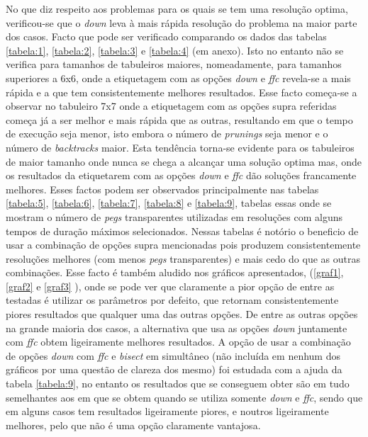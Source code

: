 \documentclass{llncs}
\begin{document}
No que diz respeito aos problemas para os quais se tem uma resolu\c{c}\~{a}o optima, verificou-se que o \emph{down} leva \`{a} mais r\'{a}pida resolu\c{c}\~{a}o do problema na maior parte dos casos. Facto que pode ser verificado comparando os dados das tabelas \ref{tabela:1}, \ref{tabela:2}, \ref{tabela:3} e \ref{tabela:4} (em anexo). Isto no entanto n\~{a}o se verifica para tamanhos de tabuleiros maiores, nomeadamente, para tamanhos superiores a 6x6, onde a etiquetagem com as op\c{c}\~{o}es \emph{down} e \emph{ffc} revela-se a mais r\'{a}pida e a que tem consistentemente melhores resultados. Esse facto come\c{c}a-se a observar no tabuleiro 7x7 onde a etiquetagem com as op\c{c}\~{o}es supra referidas come\c{c}a j\'{a} a ser melhor e mais r\'{a}pida que as outras, resultando em que o tempo de execu\c{c}\~{a}o seja menor, isto embora o n\'{u}mero de \emph{prunings} seja menor e o n\'{u}mero de \emph{backtracks} maior. Esta tend\^{e}ncia torna-se evidente para os tabuleiros de maior tamanho onde nunca se chega a alcan\c{c}ar uma solu\c{c}\~{a}o optima mas, onde os resultados da etiquetarem com as op\c{c}\~{o}es \emph{down} e \emph{ffc} d\~{a}o solu\c{c}\~{o}es francamente melhores. Esses factos podem ser observados principalmente nas tabelas \ref{tabela:5}, \ref{tabela:6}, \ref{tabela:7}, \ref{tabela:8} e \ref{tabela:9}, tabelas essas onde se mostram o n\'{u}mero de \emph{pegs} transparentes utilizadas em resolu\c{c}\~{o}es com alguns tempos de dura\c{c}\~{a}o m\'{a}ximos selecionados. Nessas tabelas \'{e} not\'{o}rio o beneficio de usar a combina\c{c}\~{a}o de op\c{c}\~{o}es supra mencionadas pois produzem consistentemente resolu\c{c}\~{o}es melhores (com menos \emph{pegs} transparentes) e mais cedo do que as outras combina\c{c}\~{o}es. Esse facto \'{e} tamb\'{e}m aludido nos gr\'{a}ficos apresentados, (\ref{graf1}, \ref{graf2} e \ref{graf3} ), onde se pode ver que claramente a pior op\c{c}\~{a}o de entre as testadas \'{e} utilizar os par\^{a}metros por defeito, que retornam consistentemente piores resultados que qualquer uma das outras op\c{c}\~{o}es. De entre as outras op\c{c}\~{o}es na grande maioria dos casos, a alternativa que usa as op\c{c}\~{o}es \emph{down} juntamente com \emph{ffc} obtem ligeiramente melhores resultados.
A op\c{c}\~{a}o de usar a combina\c{c}\~{a}o de op\c{c}\~{o}es \emph{down} com \emph{ffc} e \emph{bisect} em simult\^{a}neo (n\~{a}o inclu\'{i}da em nenhum dos gr\'{a}ficos por uma quest\~{a}o de clareza dos mesmo) foi estudada com a ajuda da tabela \ref{tabela:9}, no entanto os resultados que se conseguem obter s\~{a}o em tudo semelhantes aos em que se obtem quando se utiliza somente \emph{down} e \emph{ffc}, sendo que em alguns casos tem resultados ligeiramente piores, e noutros ligeiramente melhores, pelo que n\~{a}o \'{e} uma op\c{c}\~{a}o claramente vantajosa.
\end{document}
